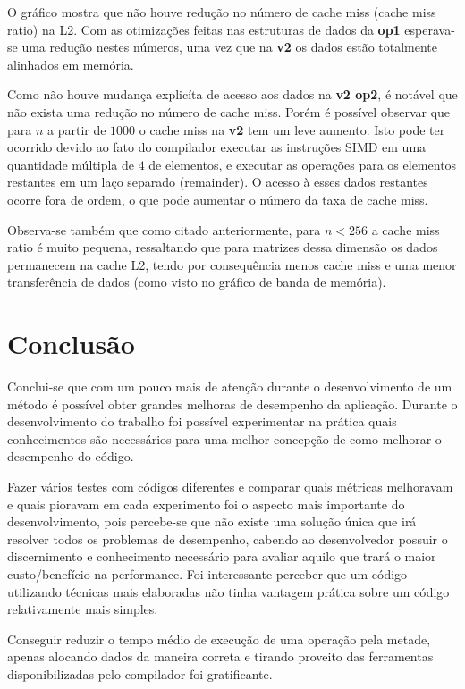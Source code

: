 \documentclass[12pt]{article}
\begin{document}
O gráfico mostra que não houve redução no número de cache miss (cache miss ratio) na L2. Com as otimizações feitas nas estruturas de dados da \textbf{op1} esperava-se uma redução nestes números, uma vez que na \textbf{v2} os dados estão totalmente alinhados em memória.

Como não houve mudança explicíta de acesso aos dados na \textbf{v2 op2}, é notável que não exista uma redução no número de cache miss. Porém é possível observar que para $n$ a partir de  $1000$ o cache miss na \textbf{v2} tem um leve aumento. Isto pode ter ocorrido devido ao fato do compilador executar as instruções SIMD em uma quantidade múltipla de $4$ de elementos, e executar as operações para os elementos restantes em um laço separado (remainder). O acesso à esses dados restantes ocorre fora de ordem, o que pode aumentar o número da taxa de cache miss.

Observa-se também que como citado anteriormente, para $n < 256 $ a cache miss ratio é muito pequena, ressaltando que para matrizes dessa dimensão os dados permanecem na cache L2, tendo por consequência menos cache miss e uma menor transferência de dados (como visto no gráfico de banda de memória).

\section{Conclusão}

Conclui-se que com um pouco mais de atenção durante o desenvolvimento de um método é possível obter grandes melhoras de desempenho da aplicação. Durante o desenvolvimento do trabalho foi possível experimentar na prática quais conhecimentos são necessários para uma melhor concepção de como melhorar o desempenho do código.

Fazer vários testes com códigos diferentes e comparar quais métricas melhoravam e quais pioravam em cada experimento foi o aspecto mais importante do desenvolvimento, pois percebe-se que não existe uma solução única que irá resolver todos os problemas de desempenho, cabendo ao desenvolvedor possuir o discernimento e conhecimento necessário para avaliar aquilo que trará o maior custo/benefício na performance. Foi interessante perceber que um código utilizando técnicas mais elaboradas não tinha vantagem prática sobre um código relativamente mais simples.

Conseguir reduzir o tempo médio de execução de uma operação pela metade, apenas alocando dados da maneira correta e tirando proveito das ferramentas disponibilizadas pelo compilador foi gratificante.
\end{document}
